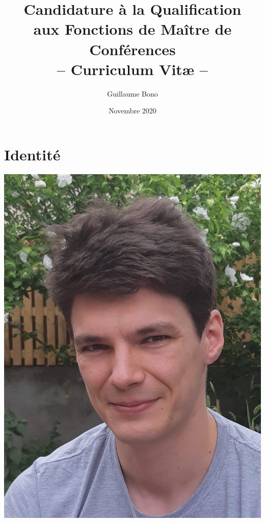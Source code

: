 \documentclass[a4paper, 11pt]{article}
\begin{document}
    \title{Candidature {\`a} la Qualification \\
           aux Fonctions de Ma{\^i}tre de Conf{\'e}rences \\
           -- Curriculum Vit{\ae} --}
    \author{Guillaume Bono}
    \date{Novembre 2020}

    \maketitle
    
    \section*{Identit{\'e}}

    \noindent
    \begin{minipage}{.09\textwidth}
        \includegraphics[width=\textwidth]{./pics/photo_gbo_bio.jpg}
    \end{minipage}
\end{document}
